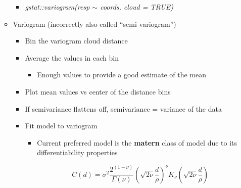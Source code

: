 \documentclass{article}
\begin{document}
\begin{itemize}
\begin{itemize}
\begin{itemize}
            \item \textit{gstat::variogram(resp $\sim$ coords, cloud = TRUE)}
        \end{itemize}
        \item Variogram (incorrectly also called ``semi-variogram'')
        \begin{itemize}
            \item Bin the variogram cloud distance
            \item Average the values in each bin
            \begin{itemize}
                \item Enough values to provide a good estimate of the mean
            \end{itemize}
            \item Plot mean values vs center of the distance bins
            \item If semivariance flattens off, semivariance = variance of the data
            \item Fit model to variogram
            \begin{itemize}
                \item Current preferred model is the \textbf{matern} class of model due to its differentiability properties
            
                \begin{equation}
                    C(d) = \sigma^2 \frac{2^{(1 - \nu)}}{\Gamma (\nu)}\left(\sqrt{2 \nu}\frac{d}{\rho}\right)^\nu K_\nu \left(\sqrt{2 \nu}\frac{d}{\rho}\right)
                \end{equation}
                

\end{itemize}
\end{itemize}
\end{itemize}
\end{itemize}
\end{document}
